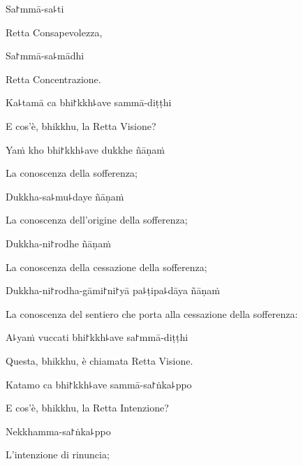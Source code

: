 \ifaivedition
\clearpage
\fi

Sa꜓mmā-sa꜕ti

\begin{english}
  Retta Consapevolezza,
\end{english}

Sa꜓mmā-sa꜕mādhi

\begin{english}
  Retta Concentrazione.
\end{english}

Ka꜕tamā ca bhi꜓kkh꜕ave sammā-diṭṭhi

\begin{english}
  E cos'è, bhikkhu, la Retta Visione?
\end{english}

Yaṁ kho bhi꜓kkh꜕ave dukkhe ñāṇaṁ

\begin{english}
  La conoscenza della sofferenza;
\end{english}

Dukkha-sa꜕mu꜕daye ñāṇaṁ

\begin{english}
  La conoscenza dell'origine della sofferenza;
\end{english}

Dukkha-ni꜓rodhe ñāṇaṁ

\begin{english}
  La conoscenza della cessazione della sofferenza;
\end{english}

Dukkha-ni꜓rodha-gāmi꜓ni꜓yā pa꜕ṭipa꜕dāya ñāṇaṁ

\begin{english}
  La conoscenza del sentiero che porta alla cessazione della sofferenza:
\end{english}

A꜕yaṁ vuccati bhi꜓kkh꜕ave sa꜓mmā-diṭṭhi

\begin{english}
  Questa, bhikkhu, è chiamata Retta Visione.
\end{english}

Katamo ca bhi꜓kkh꜕ave sammā-sa꜓ṅka꜕ppo

\begin{english}
  E cos'è, bhikkhu, la Retta Intenzione?
\end{english}

\ifaivedition
\clearpage
\fi

Nekkhamma-sa꜓ṅka꜕ppo

\begin{english}
  L'intenzione di rinuncia;
\end{english}

